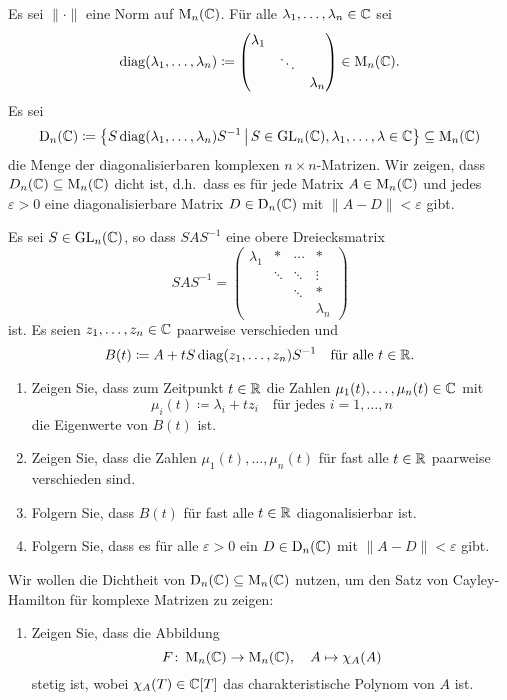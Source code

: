 \begin{question}
  Es sei $\|\cdot\|$ eine Norm auf $\operatorname{M}_n(\mathbb{C})$.
  Für alle $\lambda_1, \dotsc, \lambda_n \in \mathbb{C}$ sei
  \[
    \operatorname{\operatorname{diag}}(\lambda_1, \dotsc, \lambda_n)
    \coloneqq
    \begin{pmatrix}
      \lambda_1 &         &           \\
                & \ddots  &           \\
                &         & \lambda_n
    \end{pmatrix}
    \in \operatorname{M}_n(\mathbb{C}).
  \]
  Es sei
  \[
    \operatorname{D}_n(\mathbb{C})
    \coloneqq
    \left\{
      S \operatorname{\operatorname{diag}}(\lambda_1, \dotsc, \lambda_n) S^{-1}
    \,\middle|\,
      S \in \operatorname{GL}_n(\mathbb{C}),
      \lambda_1, \dotsc, \lambda \in \mathbb{C}
    \right\}
    \subseteq \operatorname{M}_n(\mathbb{C})
  \]
  die Menge der diagonalisierbaren komplexen $n \times n$-Matrizen.
  Wir zeigen, dass $D_n(\mathbb{C}) \subseteq \operatorname{M}_n(\mathbb{C})$ dicht ist, d.h.\ dass es für jede Matrix $A \in \operatorname{M}_n(\mathbb{C})$ und jedes $\varepsilon > 0$ eine diagonalisierbare Matrix $D \in \operatorname{D}_n(\mathbb{C})$ mit $\|A-D\| < \varepsilon$ gibt.
  
  Es sei $S \in \operatorname{GL}_n(\mathbb{C})$, so dass $S A S^{-1}$ eine obere Dreiecksmatrix
  \[
    S A S^{-1}
    =
    \begin{pmatrix}
      \lambda_1 & *       & \cdots  & *         \\
                & \ddots  & \ddots  & \vdots    \\
                &         & \ddots  & *         \\
                &         &         & \lambda_n
    \end{pmatrix}
  \]
  ist.
  Es seien $z_1, \dotsc, z_n \in \mathbb{C}$ paarweise verschieden und
  \[
    B(t)
    \coloneqq
    A + t S \operatorname{\operatorname{diag}}(z_1, \dotsc, z_n) S^{-1}
    \quad
    \text{für alle $t \in \mathbb{R}$}.
  \]
  \begin{enumerate}
    \item
      Zeigen Sie, dass zum Zeitpunkt $t \in \mathbb{R}$ die Zahlen $\mu_1(t), \dotsc, \mu_n(t) \in \mathbb{C}$ mit
      \[
        \mu_i(t) \coloneqq \lambda_i + t z_i
        \quad
        \text{für jedes $i = 1, \dotsc, n$}
      \]
      die Eigenwerte von $B(t)$ ist.
    \item
      Zeigen Sie, dass die Zahlen $\mu_1(t), \dotsc, \mu_n(t)$ für fast alle $t \in \mathbb{R}$ paarweise verschieden sind.
    \item
      Folgern Sie, dass $B(t)$ für fast alle $t \in \mathbb{R}$ diagonalisierbar ist.
    \item
      Folgern Sie, dass es für alle $\varepsilon > 0$ ein $D \in \operatorname{D}_n(\mathbb{C})$ mit $\| A - D \| < \varepsilon$ gibt.
  \end{enumerate}
  Wir wollen die Dichtheit von $\operatorname{D}_n(\mathbb{C}) \subseteq \operatorname{M}_n(\mathbb{C})$ nutzen, um den Satz von Cayley-Hamilton für komplexe Matrizen zu zeigen:
  \begin{enumerate}[resume]
    \item
      Zeigen Sie, dass die Abbildung
      \[
        F \colon \operatorname{M}_n(\mathbb{C}) \to \operatorname{M}_n(\mathbb{C}),
        \quad
        A \mapsto \chi_A(A)
      \]
      stetig ist, wobei $\chi_A(T) \in \mathbb{C}[T]$ das charakteristische Polynom von $A$ ist.
      

\end{enumerate}
\end{question}
